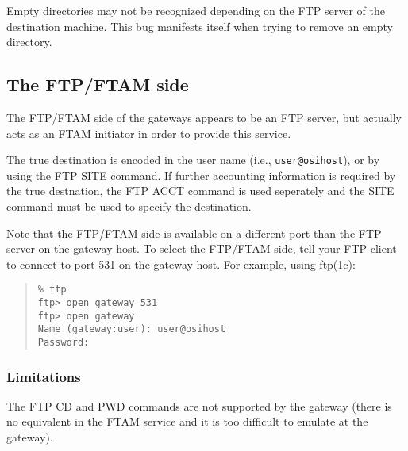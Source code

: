 Empty directories may not be recognized depending on the FTP server of the
destination machine.
This bug manifests itself when trying to remove an empty directory.

\subsection	{The FTP/FTAM side}
The FTP/FTAM side of the gateways appears to be an FTP server,
but actually acts as an FTAM initiator in order to provide this service.

The true destination is encoded in the user name (i.e., \verb"user@osihost"),
or by using the FTP SITE command.
If further accounting information is required by the true destnation,
the FTP ACCT command is used seperately and the SITE command must be used to
specify the destination.

Note that the FTP/FTAM side is available on a different port than the FTP
server on the gateway host.
To select the FTP/FTAM side,
tell your FTP client to connect to port 531 on the gateway host.
For example, using \man ftp(1c):
\begin{quote}\small\begin{verbatim}
% ftp
ftp> open gateway 531
ftp> open gateway
Name (gateway:user): user@osihost
Password:
\end{verbatim}\end{quote}

\subsubsection	{Limitations}
The FTP CD and PWD commands are not supported by the gateway
(there is no equivalent in the FTAM service and it is too difficult to emulate
at the gateway).
